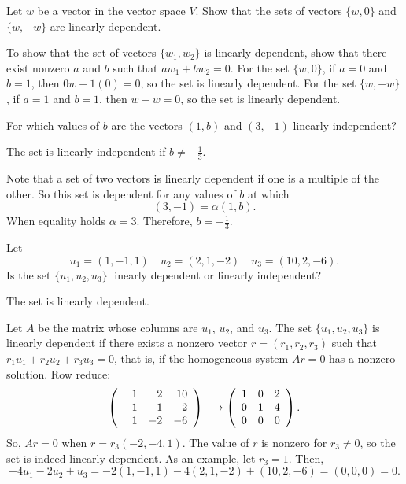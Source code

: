 \documentclass{ximera}
\begin{document}
\EXER

\TEXER

\begin{exercise} \label{c5.4.1}
Let $w$ be a vector in the vector space $V$.  Show that the sets of vectors
$\{w,0\}$ and $\{w,-w\}$ are linearly dependent.

\begin{solution}

To show that the set of vectors $\{w_1,w_2\}$ is linearly dependent,
show that there exist nonzero $a$ and $b$ such that
$aw_1 + bw_2 = 0$.  For the set $\{w,0\}$, if $a = 0$ and $b = 1$,
then $0w + 1(0) = 0$, so the set is linearly dependent.  For the
set $\{w,-w\}$, if $a = 1$ and $b = 1$, then
$w - w = 0$, so the set is linearly dependent.

\end{solution}
\end{exercise}

\begin{exercise} \label{c5.4.2}
For which values of $b$ are the vectors $(1,b)$ and $(3,-1)$
linearly independent?

\begin{solution}

\ans The set is linearly independent if $b \neq -\frac{1}{3}$.

\soln Note that a set of two vectors is linearly dependent if one is
a multiple of the other.  So this set is dependent for any values of
$b$ at which
\[
(3,-1) = \alpha(1,b).
\]
When equality holds $\alpha = 3$.  Therefore, $b = -\frac{1}{3}$.  

\end{solution}
\end{exercise}

\begin{exercise} \label{c5.4.3}
Let
\[
u_1=(1,-1,1) \quad u_2=(2,1,-2) \quad u_3 = (10,2,-6).
\]
Is the set $\{u_1,u_2,u_3\}$ linearly dependent or linearly independent?

\begin{solution}

\ans The set is linearly dependent.

\soln Let $A$ be the matrix whose columns are $u_1$, $u_2$, and $u_3$. 
The set $\{u_1,u_2,u_3\}$ is linearly dependent if there exists
a nonzero vector $r = (r_1,r_2,r_3)$ such that $r_1u_1 + r_2u_2 +
r_3u_3 = 0$, that is, if the homogeneous system $Ar = 0$ has a
nonzero solution.  Row reduce:
\[
\left(\begin{array}{rrr} 1 & 2 & 10 \\ -1 & 1 & 2 \\ 1 & -2 & -6\end{array}\right) \longrightarrow
\left(\begin{array}{rrr} 1 & 0 & 2 \\ 0 & 1 & 4 \\ 0 & 0 & 0\end{array}\right).
\]
So, $Ar = 0$ when $r = r_3(-2,-4,1)$.
The value of $r$ is nonzero for $r_3 \neq 0$, so the set is indeed
linearly dependent.
As an example, let $r_3 = 1$.  Then,
\[
-4u_1 - 2u_2 + u_3 = -2(1,-1,1) - 4(2,1,-2) + (10,2,-6) =
(0,0,0) = 0.
\]

\end{solution}
\end{exercise}
\end{document}
